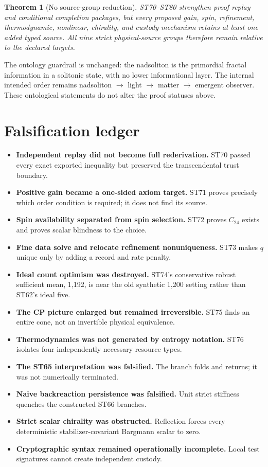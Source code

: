 \documentclass[11pt,a4paper]{article}
\newtheorem{theorem}{Theorem}[section]
\begin{document}
\begin{theorem}[No source-group reduction]
ST70--ST80 strengthen proof replay and conditional completion packages, but every proposed gain, spin, refinement, thermodynamic, nonlinear, chirality, and custody mechanism retains at least one added typed source. All nine strict physical-source groups therefore remain relative to the declared targets.
\end{theorem}

The ontology guardrail is unchanged: the nadsoliton is the primordial fractal information in a solitonic state, with no lower informational layer. The internal intended order remains nadsoliton $\to$ light $\to$ matter $\to$ emergent observer. These ontological statements do not alter the proof statuses above.

\section{Falsification ledger}

\begin{itemize}
\item \textbf{Independent replay did not become full rederivation.} ST70 passed every exact exported inequality but preserved the transcendental trust boundary.
\item \textbf{Positive gain became a one-sided axiom target.} ST71 proves precisely which order condition is required; it does not find its source.
\item \textbf{Spin availability separated from spin selection.} ST72 proves $C_{24}$ exists and proves scalar blindness to the choice.
\item \textbf{Fine data solve and relocate refinement nonuniqueness.} ST73 makes $q$ unique only by adding a record and rate penalty.
\item \textbf{Ideal count optimism was destroyed.} ST74's conservative robust sufficient mean, 1,192, is near the old synthetic 1,200 setting rather than ST62's ideal five.
\item \textbf{The CP picture enlarged but remained irreversible.} ST75 finds an entire cone, not an invertible physical equivalence.
\item \textbf{Thermodynamics was not generated by entropy notation.} ST76 isolates four independently necessary resource types.
\item \textbf{The ST65 interpretation was falsified.} The branch folds and returns; it was not numerically terminated.
\item \textbf{Naive backreaction persistence was falsified.} Unit strict stiffness quenches the constructed ST66 branches.
\item \textbf{Strict scalar chirality was obstructed.} Reflection forces every deterministic stabilizer-covariant Bargmann scalar to zero.
\item \textbf{Cryptographic syntax remained operationally incomplete.} Local test signatures cannot create independent custody.
\end{itemize}
\end{document}
